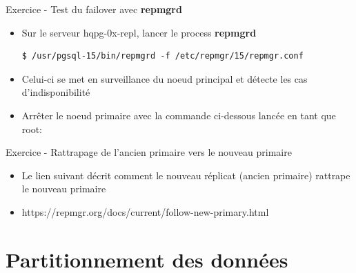 \begin{frame}[fragile]{Exercice - Test du failover avec \textbf{repmgrd}}

   \begin{itemize}
      \item Sur le serveur hqpg-0x-repl, lancer le process \textbf{repmgrd}
\begin{tiny}
\begin{Verbatim}[commandchars=\&\{\}]
$ /usr/pgsql-15/bin/repmgrd -f /etc/repmgr/15/repmgr.conf
\end{Verbatim}
\end{tiny}
      \item Celui-ci se met en surveillance du noeud principal et détecte les cas d'indisponibilité
      \item Arrêter le noeud primaire avec la commande ci-dessous lancée en tant que root:
   \end{itemize}

\end{frame}


\begin{frame}[fragile]{Exercice - Rattrapage de l'ancien primaire vers le nouveau primaire}

   \begin{itemize}
      \item Le lien suivant décrit comment le nouveau réplicat (ancien primaire) rattrape le nouveau primaire
      \item https://repmgr.org/docs/current/follow-new-primary.html
   \end{itemize}

\end{frame}


\section{Partitionnement des données}

